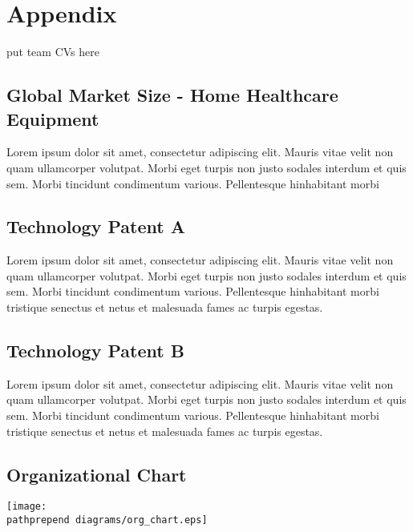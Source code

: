 \documentclass[11pt]{article}
\def\pathprepend{}%
\def\pathprepend{business_plan/}%
\begin{document}
\section{Appendix}
put team CVs here\newline
\subsection{Global Market Size - Home Healthcare Equipment}
\begin{center}
Lorem ipsum dolor sit amet, consectetur adipiscing elit. Mauris vitae velit
non quam ullamcorper volutpat. Morbi eget turpis non justo sodales interdum
et quis sem. Morbi tincidunt condimentum various. Pellentesque hinhabitant morbi
\newline
\end{center}
\hypertarget{ref_org_chart}{}
\subsection{Technology Patent A}
Lorem ipsum dolor sit amet, consectetur adipiscing elit. Mauris vitae velit
non quam ullamcorper volutpat. Morbi eget turpis non justo sodales interdum
et quis sem. Morbi tincidunt condimentum various. Pellentesque hinhabitant morbi
tristique senectus et netus et malesuada fames ac turpis egestas.\newline
\subsection{Technology Patent B}
Lorem ipsum dolor sit amet, consectetur adipiscing elit. Mauris vitae velit
non quam ullamcorper volutpat. Morbi eget turpis non justo sodales interdum
et quis sem. Morbi tincidunt condimentum various. Pellentesque hinhabitant morbi
tristique senectus et netus et malesuada fames ac turpis egestas.\newline

\subsection{Organizational Chart}
\begin{center}
\texttt{[image: \\pathprepend diagrams/org\_chart.eps]}
\end{center}
\end{document}
